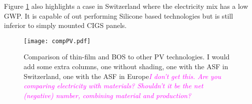 Figure \ref{fig:compPV} also highlights a case in Switzerland where the electricity mix has a low GWP. It is capable of out performing Silicone based technologies but is still inferior to simply mounted CIGS panels. 


\begin{figure}[H]
\begin{center}
\texttt{[image: compPV.pdf]}
\caption{Comparison of thin-film and BOS to other PV technologies. I would add some extra columns, one without shading, one with the ASF in Switzerland, one with the ASF in Europe\textcolor{magenta}{\textit{I don't get this. Are you comparing electricity with materials? Shouldn't it be the net (negative) number, combining material and production?}}}
\label{fig:compPV}
\end{center}
\end{figure}






